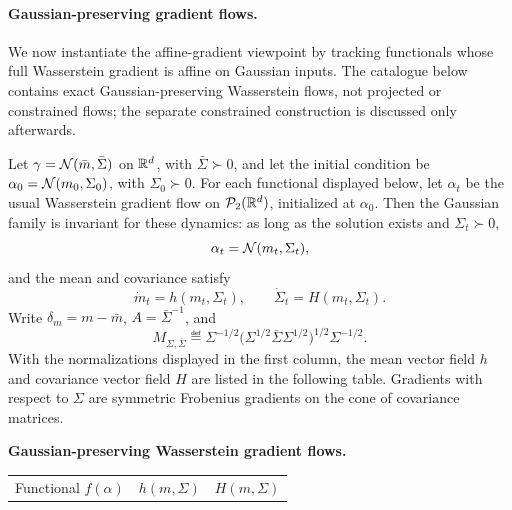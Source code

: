 \paragraph{Gaussian-preserving gradient flows.}

We now instantiate the affine-gradient viewpoint by tracking functionals whose full Wasserstein gradient is affine on Gaussian inputs. The catalogue below contains exact Gaussian-preserving Wasserstein flows, not projected or constrained flows; the separate constrained construction is discussed only afterwards.

\begin{prop}\label{prop-centered-gaussian-covariance-catalogue}
	Let \(\gamma=\mathcal{N}(\bar m,\bar\Sigma)\) on \(\mathbb{R}^d\), with \(\bar\Sigma\succ0\), and let the initial condition be \(\alpha_0=\mathcal{N}(m_0,\Sigma_0)\), with \(\Sigma_0\succ0\). For each functional displayed below, let \(\alpha_t\) be the usual Wasserstein gradient flow on \(\mathcal{P}_2(\mathbb{R}^d)\), initialized at \(\alpha_0\). Then the Gaussian family is invariant for these dynamics: as long as the solution exists and \(\Sigma_t\succ0\),
	\[
		\alpha_t=\mathcal{N}(m_t,\Sigma_t),
	\]
	and the mean and covariance satisfy
	\[
		\dot{m}_t=h(m_t,\Sigma_t),
		\qquad
		\dot{\Sigma}_t=H(m_t,\Sigma_t).
	\]
	Write \(\delta_m=m-\bar m\), \(A=\bar\Sigma^{-1}\), and
	\[
		M_{\Sigma,\bar\Sigma}
		\eqdef
		\Sigma^{-1/2}\bigl(\Sigma^{1/2}\bar\Sigma\Sigma^{1/2}\bigr)^{1/2}\Sigma^{-1/2}.
	\]
		With the normalizations displayed in the first column, the mean vector field \(h\) and covariance vector field \(H\) are listed in the following table. Gradients with respect to \(\Sigma\) are symmetric Frobenius gradients on the cone of covariance matrices.
		\begin{center}
		\begingroup
		\small
		\renewcommand{\arraystretch}{1.55}
		\textbf{Gaussian-preserving Wasserstein gradient flows.}\par\smallskip
		\begin{tabularx}{\linewidth}{>{\raggedright\arraybackslash}p{.42\linewidth}>{\centering\arraybackslash}p{.18\linewidth}>{\raggedright\arraybackslash}X}
			\hline
			Functional \(f(\alpha)\) & \(h(m,\Sigma)\) & \(H(m,\Sigma)\) \\

\end{tabularx}
\end{center}
\end{prop}
